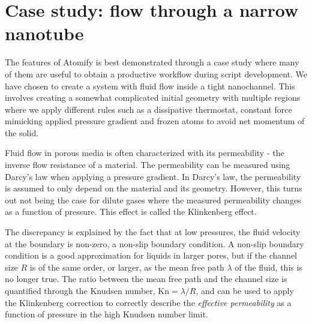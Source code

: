 \documentclass[aps,pre,twocolumn,letterpaper,floatfix,nofootinbib]{revtex4}
\begin{document}
\section{\label{sec:casestudy}Case study: flow through a narrow nanotube}
The features of Atomify is best demonstrated through a case study where many of
them are useful to obtain a productive workflow during script development.
We have chosen to create a system with fluid flow inside a tight nanochannel.
This involves creating a somewhat complicated initial geometry with multiple regions
where we apply different rules such as a dissipative thermostat, constant force mimicking
applied pressure gradient and frozen atoms to avoid net momentum of the solid.

Fluid flow in porous media is often characterized with its permeability - the inverse flow resistance of a material.
The permeability can be measured using Darcy's law when applying a pressure gradient.
In Darcy's law, the permeability is assumed to only depend on the material and its geometry.
However, this turns out not being the case for dilute
gases where the measured permeability changes as a function of pressure\citep{klinkenberg1941permeability}.
This effect is called the Klinkenberg effect.

The discrepancy is explained by the fact that at low pressures, the fluid velocity
at the boundary is non-zero, a non-slip boundary condition.
A non-slip boundary condition is a good approximation for liquids in larger pores,
but if the channel size $R$ is of the same order,
or larger, as the mean free path $\lambda$ of the fluid, this is no longer true.
The ratio between the mean free path and the channel size is quantified through
the Knudsen number, $\text{Kn} = \lambda / R$, and can be used to apply the Klinkenberg correction\citep{klinkenberg1941permeability}
to correctly describe the \textit{effective permeability} as a function of pressure in the high Knudsen number limit.
\end{document}
